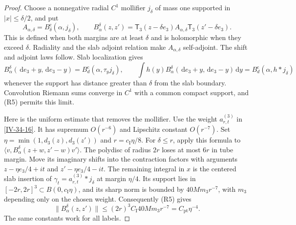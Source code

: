\documentclass[11pt,letterpaper,reqno]{amsart}
\theoremstyle{definition}
\theoremstyle{remark}
\begin{document}
\begin{proof}
Choose a nonnegative radial $C^1$ mollifier $j_\delta$ of mass
one supported in $|x|\le\delta/2$, and put
\[
 A_{\alpha,\delta}=B_\delta^{\mathrm c}(\alpha,j_\delta),\qquad
 B_\alpha^\delta(z,z')=
 \mathsf T_3(z-\delta e_3)A_{\alpha,\delta}
                         \mathsf T_3(z'-\delta e_3).
\]
This is defined when both margins are at least $\delta$ and
is holomorphic when they exceed $\delta$. Radiality and the
slab adjoint relation make $A_{\alpha,\delta}$ self-adjoint.
The shift and adjoint laws follow. Slab localization gives
\[
 B_\alpha^\delta(\,\mathrm{d}e_3+y,\,\mathrm{d}e_3-y)
       =B_d^{\mathrm c}(\alpha,\tau_yj_\delta),\qquad
 \int h(y)B_\alpha^\delta(\,\mathrm{d}e_3+y,\,\mathrm{d}e_3-y)\,\mathrm{d}y
       =B_d^{\mathrm c}(\alpha,h*j_\delta)
\]
whenever the support has distance greater than $\delta$ from
the slab boundary. Convolution Riemann sums converge in $C^1$
with a common compact support, and (R5) permits this limit.

Here is the uniform estimate that removes the mollifier.
Use the weight $a^{(3)}_{r,t}$ in \eqref{IV-34-16}.
It has supremum $O(r^{-6})$ and Lipschitz constant
$O(r^{-7})$.
Set $\eta=\min(1,d_3(z),d_3(z'))$ and
$r=c_{\mathrm I}\eta/8$. For $\delta\le r$, apply this formula
to $\langle v,B_\alpha^\delta(z+w,z'-w)v'\rangle$.
The polydisc of radius $2r$ loses at most $6r$ in tube margin.
Move its imaginary shifts into the contraction factors with
arguments $z-\eta e_3/4+it$ and $z'-\eta e_3/4-it$.
The remaining integral in $x$ is the centered slab insertion
of $\gamma_t=a^{(3)}_{r,t}*j_\delta$ at margin $\eta/4$.
Its support lies in $[-2r,2r]^3\subset B(0,c_{\mathrm I}\eta)$,
and its sharp norm is bounded by $40Mm_3r^{-7}$, with $m_3$
depending only on the chosen weight. Consequently (R5) gives
\[
 \|B_\alpha^\delta(z,z')\|
   \le(2r)^3C_{\mathrm I}40Mm_3r^{-7}
   =C_{\mathrm{pt}}\eta^{-4}.
\]
The same constants work for all labels.


\end{proof}
\end{document}
